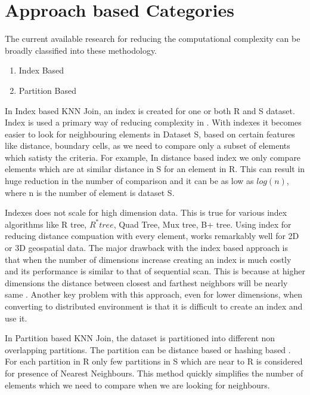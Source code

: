 \bigskip

\section{Approach based Categories}
The current available research for reducing the computational
complexity can be broadly classified into these methodology.
\begin{enumerate}
\item Index Based
\item Partition Based
\end{enumerate}

\medskip

In Index based KNN Join, an index is created for one or both R and S
dataset. Index is used a primary way of reducing complexity in \cite{jagadish_idistance:_2005}
\cite{yu_efficient_2007} \cite{bohm_epsilon_2001}.  With indexes it
becomes easier to look for neighbouring elements in Dataset S, based
on certain features like distance, boundary cells,  as we
need to compare only a subset of elements which satisty the
criteria. For example, In distance based index
\cite{jagadish_idistance:_2005} we only compare elements which are at
similar distance in S for an element in R. This can result in huge
reduction in the number of comparison and it can be as low as $log(n)$, where n is the number of element is
dataset S.

\medskip

Indexes does not scale for high dimension data. This is true for various
index algorithms like R tree, $R^* tree$, Quad Tree, Mux tree, B+
tree. Using index for reducing distance compuation with every element, works
remarkably well for 2D or 3D geospatial data. The major drawback with the
index based approach is that when the number of dimensions increase
creating an index is much costly and its performance is similar to
that of sequential scan. This is because at higher dimensions the distance
between closest and farthest neighbors will be nearly same
\cite{beyer_when_1999}. Another key problem with this approach, even
for lower dimensions, when
converting to distributed environment is that it is difficult to
create an index and use it.

\bigskip

In Partition based KNN Join, the dataset is partitioned into different
non overlapping partitions. The
partition can be distance based\cite{lu_efficient_2012} or hashing
based \cite{stupar_rankreduceprocessing_2010} \cite{yao_k_2010}. For each partition in R only few partitions in S which are
near to R is considered for presence of Nearest Neighbours. This
method quickly simplifies the number of elements which we need to
compare when we are looking for neighbours.

